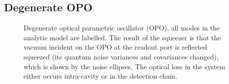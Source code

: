 

\subsection{Degenerate OPO}

\begin{figure}
	\centering
	\caption{Degenerate optical parametric oscillator (OPO), all modes in the analytic model are labelled. The result of the squeezer is that the vacuum incident on the OPO at the readout port is reflected squeezed (its quantum noise variances and covariances changed), which is shown by the noise ellipses. The optical loss in the system either occurs intra-cavity or in the detection chain.}
	\label{fig:dOPO_config}
\end{figure}

